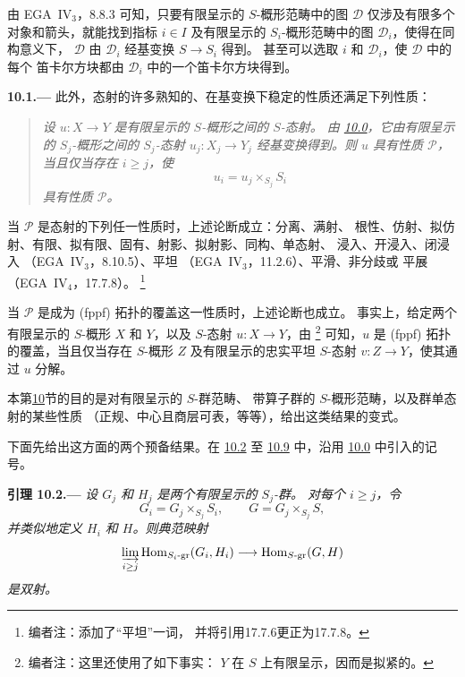 由 EGA~IV\(_3\)，8.8.3 可知，只要有限呈示的 \(S\)-概形范畴中的图
\(\mathcal D\) 仅涉及有限多个对象和箭头，就能找到指标 \(i\in I\)
及有限呈示的 \(S_i\)-概形范畴中的图 \(\mathcal D_i\)，使得在同构意义下，
\(\mathcal D\) 由 \(\mathcal D_i\) 经基变换 \(S\to S_i\) 得到。
甚至可以选取 \(i\) 和 \(\mathcal D_i\)，使 \(\mathcal D\) 中的每个
笛卡尔方块都由 \(\mathcal D_i\) 中的一个笛卡尔方块得到。

\medskip
{}\label{par:sga3-VIB-10.1}%
\noindent\textbf{10.1.---}
此外，态射的许多熟知的、在基变换下稳定的性质还满足下列性质：
\begin{quote}
\emph{设 \(u:X\to Y\) 是有限呈示的 \(S\)-概形之间的 \(S\)-态射。
由 \hyperref[par:sga3-VIB-10.0]{10.0}，它由有限呈示的 \(S_j\)-概形之间的
\(S_j\)-态射 \(u_j:X_j\to Y_j\) 经基变换得到。则 \(u\) 具有性质
\(\mathcal P\)，当且仅当存在 \(i\geq j\)，使}
\[
  u_i=u_j\times_{S_j}S_i
\]
\emph{具有性质 \(\mathcal P\)。}
\end{quote}

当 \(\mathcal P\) 是态射的下列任一性质时，上述论断成立：分离、满射、
根性、仿射、拟仿射、有限、拟有限、固有、射影、拟射影、同构、单态射、
浸入、开浸入、闭浸入
\textup{（EGA~IV\(_3\)，8.10.5）}、平坦
\textup{（EGA~IV\(_3\)，11.2.6）}、平滑、非分歧或
平展 \textup{（EGA~IV\(_4\)，17.7.8）}。%
\footnote{\label{note:sga3-VIB-91}编者注：添加了“平坦”一词，
并将引用17.7.6更正为17.7.8。}

当 \(\mathcal P\) 是成为 \textup{(fppf)} 拓扑的覆盖这一性质时，上述论断也成立。
事实上，给定两个有限呈示的 \(S\)-概形 \(X\) 和 \(Y\)，以及
\(S\)-态射 \(u:X\to Y\)，由
\hyperref[sga3:iv:proposition:6:3:1:item:i:01]%
  {}%
\footnote{\label{note:sga3-VIB-92}编者注：这里还使用了如下事实：
\(Y\) 在 \(S\) 上有限呈示，因而是拟紧的。}
可知，\(u\) 是 \textup{(fppf)} 拓扑的覆盖，当且仅当存在 \(S\)-概形
\(Z\) 及有限呈示的忠实平坦 \(S\)-态射 \(v:Z\to Y\)，使其通过 \(u\) 分解。

本第\hyperref[sec:sga3-VIB-10]{10}节的目的是对有限呈示的 \(S\)-群范畴、
带算子群的 \(S\)-概形范畴，以及群单态射的某些性质
\textup{（正规、中心且商层可表，等等）}，给出这类结果的变式。

下面先给出这方面的两个预备结果。在
\hyperref[lem:sga3-VIB-10.2]{10.2} 至
\hyperref[lem:sga3-VIB-10.9]{10.9} 中，沿用
\hyperref[par:sga3-VIB-10.0]{10.0} 中引入的记号。

\medskip
{}\label{lem:sga3-VIB-10.2}%
\noindent\textbf{引理 10.2.---}
\emph{设 \(G_j\) 和 \(H_j\) 是两个有限呈示的 \(S_j\)-群。
对每个 \(i\geq j\)，令
\[
  G_i=G_j\times_{S_j}S_i,
  \qquad
  G=G_j\times_{S_j}S,
\]
并类似地定义 \(H_i\) 和 \(H\)。则典范映射}
\label{form:sga3-VIB-10.2-Hom-limit}%
\[
  \varinjlim_{i\geq j}
    \operatorname{Hom}_{S_i\text{-}\mathrm{gr}}(G_i,H_i)
    \longrightarrow
    \operatorname{Hom}_{S\text{-}\mathrm{gr}}(G,H)
\]
\emph{是双射。}

